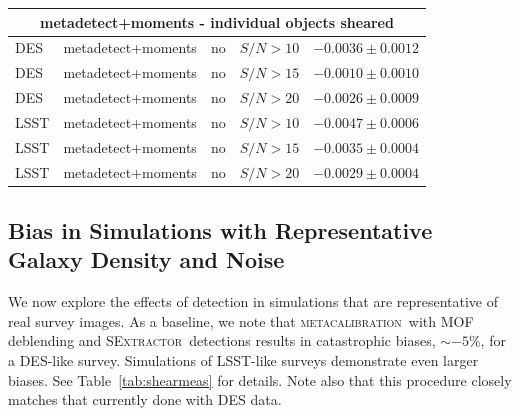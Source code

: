 \documentclass[fleqn,useAMS,usenatbib]{mnras}
\newcommand{\snr}{$S/N$}
\newcommand{\mcal}{\textsc{metacalibration}}
\newcommand{\sx}{\textsc{SExtractor}}
\begin{document}
\begin{table}
\begin{tabular}{|l|l|l|c|c|}
    \hline
    \multicolumn{5}{c}{metadetect+moments - individual objects sheared}\\
    \hline
    DES   & metadetect+moments & no & \snr$ > 10$ & $-0.0036 \pm 0.0012$  \\
    DES   & metadetect+moments & no & \snr$ > 15$ & $-0.0010 \pm 0.0010$  \\
    DES   & metadetect+moments & no & \snr$ > 20$ & $-0.0026 \pm 0.0009$  \\
    \hline
    LSST  & metadetect+moments & no & \snr$ > 10$ & $-0.0047 \pm 0.0006$  \\
    LSST  & metadetect+moments & no & \snr$ > 15$ & $-0.0035 \pm 0.0004$  \\
    LSST  & metadetect+moments & no & \snr$ > 20$ & $-0.0029 \pm 0.0004$  \\
    \hline
  \end{tabular}

\end{table}

\subsection{Bias in Simulations with Representative Galaxy Density and Noise}

We now explore the effects of detection in simulations that are representative
of real survey images. As a baseline, we note that \mcal\ with MOF
deblending and \sx\ detections results in catastrophic biases, $\sim-5\%$, for
a DES-like survey. Simulations of LSST-like surveys demonstrate even larger
biases. See Table~\ref{tab:shearmeas} for details. Note also that this
procedure closely matches that currently done with DES data.
\end{document}
